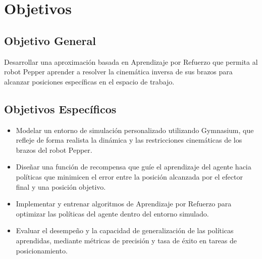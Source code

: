 \section{Objetivos}

\subsection{Objetivo General}

Desarrollar una aproximación basada en Aprendizaje por Refuerzo que permita al robot Pepper aprender a resolver la cinemática inversa de sus brazos para alcanzar posiciones específicas en el espacio de trabajo.

\subsection{Objetivos Específicos}

\begin{itemize}
	\item Modelar un entorno de simulación personalizado utilizando Gymnasium, que refleje de forma realista la dinámica y las restricciones cinemáticas de los brazos del robot Pepper.
	
	\item Diseñar una función de recompensa que guíe el aprendizaje del agente hacia políticas que minimicen el error entre la posición alcanzada por el efector final y una posición objetivo.
	
	\item Implementar y entrenar algoritmos de Aprendizaje por Refuerzo para optimizar las políticas del agente dentro del entorno simulado.
	
	\item Evaluar el desempeño y la capacidad de generalización de las políticas aprendidas, mediante métricas de precisión y tasa de éxito en tareas de posicionamiento.\\
\end{itemize}


